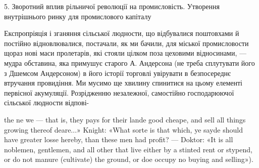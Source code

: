 5. Зворотний вплив рільничої революції на промисловість.
Утворення внутрішнього ринку для промислового капіталу

Експропріяція і зганяння сільської людности, що відбувалися
поштовхами й постійно відновлювалися, постачали, як ми бачили,
для міської промисловости щораз нові маси пролетарів, які
стояли цілком поза цеховими відносинами, — мудра обставина,
яка примушує старого А. Андерсона (не треба сплутувати його
з Дшемсом Андерсоном) в його історії торговлі увірувати в безпосереднє
втручання провидіння. Ми мусимо ще хвилину спинитися
на цьому елементі первісної акумуляції. Розрідженню незалежної,
самостійно господарюючої сільської людности відпові-

the ne we — that is, they pays for their lande good cheape, and sell all things
growing thereof deare...» Knight: «What sorte is that which, ye sayde
should have greater losse hereby, than these men had profit? — Doktor:
«It is all noblemen, gentlemen, and all other that live either by a stinted
rent or stypend, or do not manure (cultivate) the ground, or doe occupy no
buying and selling»).
\parbreak{}  %

